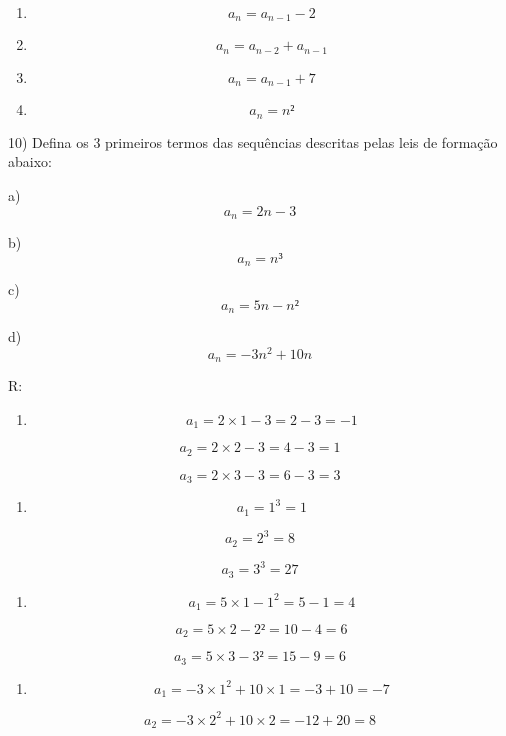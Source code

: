 \begin{enumerate}
\def\labelenumi{\alph{enumi})}
\item
  \[a_{n} = a_{n - 1} - 2\]
\item
  \[a_{n} = a_{n - 2} + a_{n - 1}\]
\item
  \[a_{n} = a_{n - 1} + 7\]
\item
  \[a_{n} = n²\]
\end{enumerate}

10) Defina os 3 primeiros termos das sequências descritas pelas leis de
formação abaixo:

a) \[a_{n} = 2n - 3\]

b) \[a_{n} = n³\]

c) \[a_{n} = 5n - n²\]

d) \[a_{n} = - 3n^{2} + 10n\]

R:

\begin{enumerate}
\def\labelenumi{\alph{enumi})}
\tightlist
\item
  \[a_{1} = 2 \times 1 - 3 = 2 - 3 = - 1\]
\end{enumerate}

\[{}a_{2} = 2 \times 2 - 3 = 4 - 3 = 1\]

\[{a}_{3} = 2 \times 3 - 3 = 6 - 3 = 3\]

\begin{enumerate}
\def\labelenumi{\alph{enumi})}
\setcounter{enumi}{1}
\tightlist
\item
  \[a_{1} = 1^{3} = 1\]
\end{enumerate}

\[{a}_{2} = 2^{3} = 8\]

\[{a}_{3} = 3^{3} = 27\]

\begin{enumerate}
\def\labelenumi{\alph{enumi})}
\setcounter{enumi}{2}
\tightlist
\item
  \[a_{1} = 5 \times 1 - 1^{2} = 5 - 1 = 4\]
\end{enumerate}

\[\ {a}_{2} = 5 \times 2 - 2² = 10 - 4 = 6\]

\[{a}_{3} = 5 \times 3 - 3² = 15 - 9 = 6\]

\begin{enumerate}
\def\labelenumi{\alph{enumi})}
\setcounter{enumi}{3}
\tightlist
\item
  \[a_{1} = - 3 \times 1^{2} + 10 \times 1 = - 3 + 10 = - 7\]
\end{enumerate}

\[a_{2} = - 3 \times 2^{2} + 10 \times 2 = - 12 + 20 = 8\]

